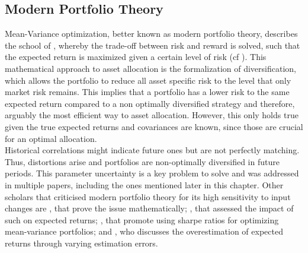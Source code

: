 \subsection{Modern Portfolio Theory}
Mean-Variance optimization, better known as modern portfolio theory, describes the school of \citeauthor{markowitz_1952}, whereby the trade-off between risk and reward is solved, such that the expected return is maximized given a certain level of risk (cf \cite{markowitz_1952}). This mathematical approach to asset allocation is the formalization of diversification, which allows the portfolio to reduce all asset specific risk to the level that only market risk remains. This implies that a portfolio has a lower risk to the same expected return compared to a non optimally diversified strategy and therefore, arguably the most efficient way to asset allocation. However, this only holds true given the true expected returns and covariances are known, since those are crucial for an optimal allocation.\\
Historical correlations might indicate future ones but are not perfectly matching. Thus, distortions arise and portfolios are non-optimally diversified in future periods. This parameter uncertainty is a key problem to solve and was addressed in multiple papers, including the ones mentioned later in this chapter. Other scholars that criticised modern portfolio theory for its high sensitivity to input changes are \cite{chopra_1993}, that prove the issue mathematically; \cite{best_grauer_1991}, that assessed the impact of such on expected returns; \cite{jobson_korkie_1981}, that promote using sharpe ratios for optimizing mean-variance portfolios; and \cite{broadie_1981}, who discusses the overestimation of expected returns through varying estimation errors.
